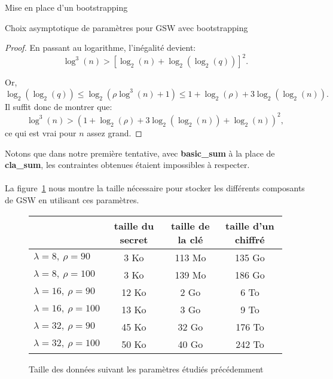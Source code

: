 \begin{section}{Mise en place d'un bootstrapping}
\begin{subsection}{Choix asymptotique de paramètres pour GSW avec bootstrapping}
\begin{proof}
En passant au logarithme, l'inégalité devient:
\[ \log^3(n) > {\left[\log_2(n) + \log_2(\log_2(q))\right]}^2. \]

Or,
\[ \log_2(\log_2(q)) \leqslant \log_2(\rho \log^3(n) + 1) \leqslant 1 + \log_2(\rho) + 3 \log_2(\log_2(n)).\]
Il suffit donc de montrer que:
\[ \log^3(n) > {(1 + \log_2(\rho) + 3\log_2(\log_2(n)) + \log_2(n))}^2,\]
ce qui est vrai pour $n$ assez grand.
\end{proof}
\begin{rmq}
Notons que dans notre première tentative, avec \textbf{basic\_sum} à la place de \textbf{cla\_sum}, 
les contraintes obtenues étaient impossibles à respecter.
\end{rmq}

\paragraph{}
La figure~\ref{size_boostrapping} nous montre la taille nécessaire
pour stocker les différents composants de GSW en utilisant ces paramètres.
\begin{figure}[!ht]
\begin{tabular}{|l|c|c|c|}
\hline
& taille du secret & taille de la clé & taille d'un chiffré \\
\hline
$\lambda = 8, \ \rho = 90$ & 3 Ko & 113 Mo & 135 Go \\
\hline
$\lambda = 8, \ \rho = 100$ & 3 Ko & 139 Mo & 186 Go \\
\hline
$\lambda = 16, \ \rho = 90$ & 12 Ko & 2 Go & 6 To \\
\hline
$\lambda = 16, \ \rho = 100$ & 13 Ko & 3 Go & 9 To \\
\hline
$\lambda = 32, \ \rho = 90$ & 45 Ko & 32 Go & 176 To \\
\hline
$\lambda = 32, \ \rho = 100$ & 50 Ko & 40 Go & 242 To \\
\hline
\end{tabular}
\caption{Taille des données suivant les paramètres étudiés précédemment}
\label{size_boostrapping}
\end{figure}

\end{subsection}
\end{section}
